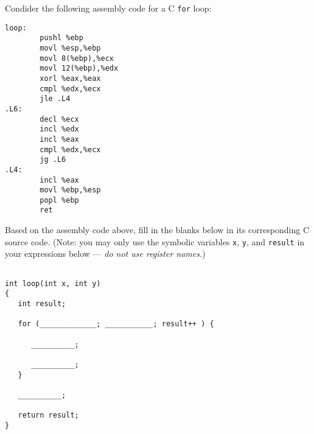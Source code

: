 \begin{problem}{8}
Condider the following assembly code for a C {\tt for} loop:

\begin{verbatim}
loop:
        pushl %ebp
        movl %esp,%ebp
        movl 8(%ebp),%ecx
        movl 12(%ebp),%edx
        xorl %eax,%eax
        cmpl %edx,%ecx
        jle .L4
.L6:
        decl %ecx
        incl %edx
        incl %eax
        cmpl %edx,%ecx
        jg .L6
.L4:
        incl %eax
        movl %ebp,%esp
        popl %ebp
        ret
\end{verbatim}

Based on the assembly code above, fill in the blanks below in its
corresponding C source code.  (Note: you may only use the symbolic
variables {\tt x}, {\tt y}, and {\tt result} in your expressions below
--- {\em do not use register names.})

\begin{verbatim}

int loop(int x, int y)
{
   int result;

   for (_____________; ___________; result++ ) {

      __________;

      __________;
   }

   __________;

   return result;
}

\end{verbatim}

%
%
%

\end{problem}
